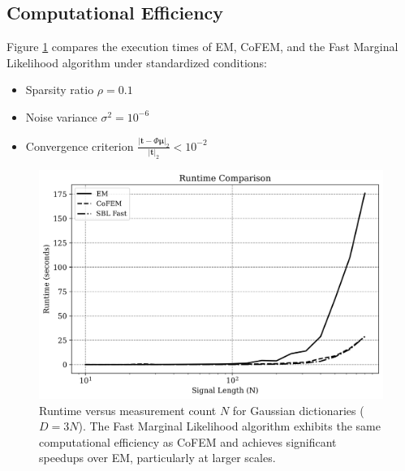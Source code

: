 \documentclass{article}
\begin{document}
\subsection{Computational Efficiency}
Figure \ref{fig:runtimeSBl} compares the execution times of EM, CoFEM, and the Fast Marginal Likelihood algorithm under standardized conditions:
\begin{itemize}
\item Sparsity ratio $ \rho = 0.1 $
\item Noise variance $ \sigma^2 = 10^{-6} $
\item Convergence criterion $\frac{|\mathbf{t} - \Phi \boldsymbol{\mu}|_2}{|\mathbf{t}|_2} < 10^{-2}$
\end{itemize}


\begin{figure}[H]
    \centering
    \includegraphics[width=0.75\linewidth]{Figures/runtime_comp_EMCoFEMSBL.png}
    \caption{Runtime versus measurement count $N$ for Gaussian dictionaries ($D=3N$). The Fast Marginal Likelihood algorithm exhibits the same computational efficiency as CoFEM and achieves significant speedups over EM, particularly at larger scales.}
    \label{fig:runtimeSBl}
\end{figure}
\end{document}
